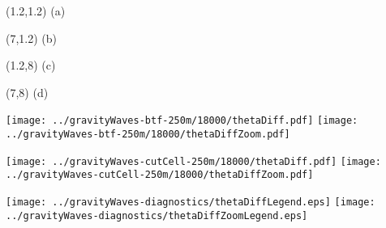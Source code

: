 \documentclass{article}
\begin{document}
\TPMargin{3pt}
\begin{textblock}{0.75}(1.2,1.2)
\normalsize
\centering
(a)
\end{textblock}
\begin{textblock}{0.75}(7,1.2)
\normalsize
\centering
(b)
\end{textblock}
\begin{textblock}{0.75}(1.2,8)
\normalsize
\centering
(c)
\end{textblock}
\begin{textblock}{0.75}(7,8)
\normalsize
\centering
(d)
\end{textblock}
\texttt{[image: ../gravityWaves-btf-250m/18000/thetaDiff.pdf]}
\hspace{0.1in}
\texttt{[image: ../gravityWaves-btf-250m/18000/thetaDiffZoom.pdf]}
\vspace*{0.1in}

\texttt{[image: ../gravityWaves-cutCell-250m/18000/thetaDiff.pdf]}
\hspace{0.1in}
\texttt{[image: ../gravityWaves-cutCell-250m/18000/thetaDiffZoom.pdf]}
\vspace*{0.1in}

\texttt{[image: ../gravityWaves-diagnostics/thetaDiffLegend.eps]}
\hspace{0.2in}
\texttt{[image: ../gravityWaves-diagnostics/thetaDiffZoomLegend.eps]}
\end{document}
